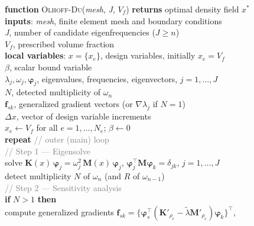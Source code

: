 \documentclass[12pt,a4paper]{article}
\newcommand{\kw}[1]{\textbf{#1}}          %
\newcommand{\fn}[1]{\textsc{#1}}          %
\newcommand{\var}[1]{\textit{#1}}         %
\newcommand{\cm}[1]{\textcolor{gray}{#1}} %
\newcommand{\ind}{\hspace*{1.4em}}        %
\newcommand{\indd}{\hspace*{2.8em}}       %
\newcommand{\assign}{\ensuremath{\leftarrow}}%
\begin{document}
\medskip
\begin{algobox}
\kw{function} \fn{Olhoff-Du}(\var{mesh}, \var{J}, \var{$V_f$})
\kw{returns} optimal density field $x^*$\\[2pt]
\ind\kw{inputs}: \var{mesh}, finite element mesh and boundary conditions\\
\ind\hspace*{4.2em}\var{J}, number of candidate eigenfrequencies ($J \geq n$)\\
\ind\hspace*{4.2em}$V_f$, prescribed volume fraction\\[2pt]
\ind\kw{local variables}:
  $x = \{x_e\}$, design variables, initially $x_e = V_f$\\
\ind\hspace*{9.5em}
  $\beta$, scalar bound variable\\
\ind\hspace*{9.5em}
  $\lambda_j, \omega_j, \boldsymbol{\varphi}_j$,
  eigenvalues, frequencies, eigenvectors, $j=1,\ldots,J$\\
\ind\hspace*{9.5em}
  $N$, detected multiplicity of $\omega_n$\\
\ind\hspace*{9.5em}
  $\mathbf{f}_{sk}$, generalized gradient vectors (or
  $\nabla\!\lambda_j$ if $N=1$)\\
\ind\hspace*{9.5em}
  $\Delta\var{x}$, vector of design variable increments\\[6pt]
%
$x_e \assign V_f$ \quad for all $e = 1,\ldots,N_e$;
\quad $\beta \assign 0$\\[4pt]
%
\kw{repeat} \cm{// outer (main) loop}\\
\ind\cm{// Step 1 — Eigensolve}\\
\ind solve $\mathbf{K}(\var{x})\,\boldsymbol{\varphi}_j
           = \omega_j^2\,\mathbf{M}(\var{x})\,\boldsymbol{\varphi}_j$,
      $\boldsymbol{\varphi}_j^{\top}\mathbf{M}\boldsymbol{\varphi}_k=\delta_{jk}$,
      $j=1,\ldots,J$\\
\ind detect multiplicity $N$ of $\omega_n$ (and $R$ of $\omega_{n-1}$)\\[3pt]
%
\ind\cm{// Step 2 — Sensitivity analysis}\\
\ind\kw{if} $N > 1$ \kw{then}\\
\indd compute generalized gradients
      $\mathbf{f}_{sk}=\{\boldsymbol{\varphi}_s^{\top}
      (\mathbf{K}'_{\rho_e}-\tilde{\lambda}\mathbf{M}'_{\rho_e})
      \boldsymbol{\varphi}_k\}^{\top}$,\;

\end{algobox}
\end{document}
